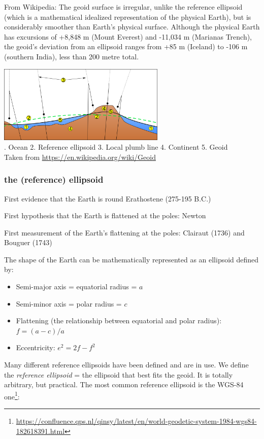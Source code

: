 From Wikipedia: The geoid surface is irregular, unlike the reference ellipsoid 
(which is a mathematical idealized representation of the physical Earth), but 
is considerably smoother than Earth's physical surface. Although the physical Earth has 
excursions of +8,848 m (Mount Everest) and -11,034 m (Marianas Trench), 
the geoid's deviation from an ellipsoid ranges from +85 m (Iceland) to -106 m (southern India), 
less than 200 \si{metre} total.


\begin{center}
\includegraphics[width=8cm]{images/geoid/Geoid}\\
{. Ocean
2. Reference ellipsoid
3. Local plumb line
4. Continent
5. Geoid\\
Taken from \url{https://en.wikipedia.org/wiki/Geoid}}
\end{center}


\subsubsection{the (reference) ellipsoid}

First evidence that the Earth is round Erathostene (275-195 B.C.)

First hypothesis that the Earth is flattened at the poles: Newton

First measurement of the Earth’s flattening at the poles: Clairaut (1736) and Bouguer (1743)

The shape of the Earth can be mathematically represented as an ellipsoid defined by:
\begin{itemize}
\item Semi-major axis = equatorial radius = $a$
\item Semi-minor axis = polar radius = $c$
\item Flattening (the relationship between equatorial and polar radius): $f = (a-c)/a$
\item Eccentricity: $e^2 =2f-f^2$
\end{itemize}

Many different reference ellipsoids have been defined and are in use.
We define the {\it reference ellipsoid} = the ellipsoid that best fits the geoid.
It is totally arbitrary, but practical. 
The most common reference ellipsoid is the WGS-84 one\footnote{\url{https://confluence.qps.nl/qinsy/latest/en/world-geodetic-system-1984-wgs84-182618391.html}}:

